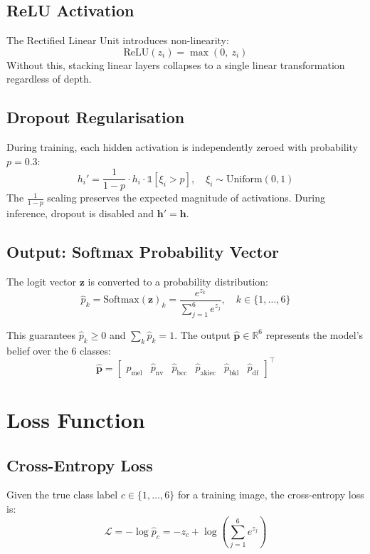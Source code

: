 \documentclass[12pt]{article}
\begin{document}
\subsection{ReLU Activation}

The Rectified Linear Unit introduces non-linearity:
\[
\text{ReLU}(z_i) = \max(0,\ z_i)
\]
Without this, stacking linear layers collapses to a single linear
transformation regardless of depth.

\subsection{Dropout Regularisation}

During training, each hidden activation is independently zeroed with
probability $p = 0.3$:
\[
h_i' = \frac{1}{1-p} \cdot h_i \cdot \mathbb{1}[\xi_i > p],
\quad \xi_i \sim \text{Uniform}(0,1)
\]
The $\frac{1}{1-p}$ scaling preserves the expected magnitude of activations.
During inference, dropout is disabled and $\bm{h}' = \bm{h}$.

\subsection{Output: Softmax Probability Vector}

The logit vector $\bm{z}$ is converted to a probability distribution:
\[
\hat{p}_k = \text{Softmax}(\bm{z})_k = \frac{e^{z_k}}{\sum_{j=1}^{6} e^{z_j}},
\quad k \in \{1,\ldots,6\}
\]

This guarantees $\hat{p}_k \geq 0$ and $\sum_k \hat{p}_k = 1$.
The output $\hat{\bm{p}} \in \mathbb{R}^6$ represents the model's belief over
the 6 classes:
\[
\hat{\bm{p}} =
\begin{bmatrix}
\hat{p}_\text{mel} & \hat{p}_\text{nv} & \hat{p}_\text{bcc} &
\hat{p}_\text{akiec} & \hat{p}_\text{bkl} & \hat{p}_\text{df}
\end{bmatrix}^\top
\]

\section{Loss Function}

\subsection{Cross-Entropy Loss}

Given the true class label $c \in \{1,\ldots,6\}$ for a training image, the
cross-entropy loss is:
\[
\mathcal{L} = -\log \hat{p}_c = -z_c + \log\!\left(\sum_{j=1}^{6} e^{z_j}\right)
\]
\end{document}
